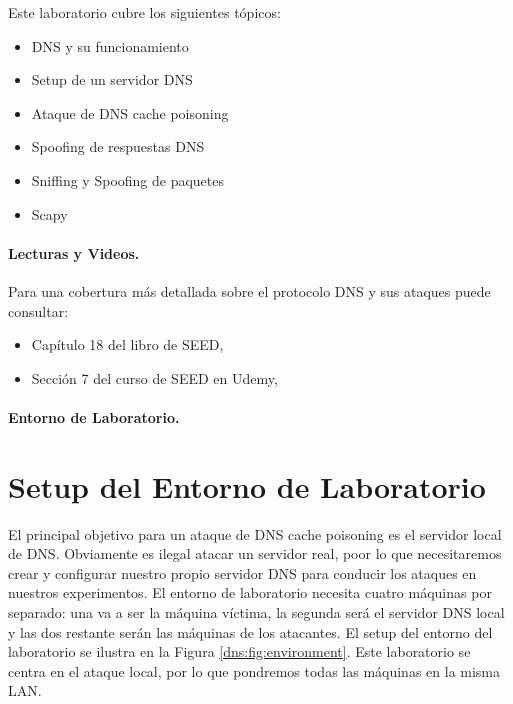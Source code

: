 Este laboratorio cubre los siguientes tópicos:


\begin{itemize}[noitemsep]
\item DNS y su funcionamiento
\item Setup de un servidor DNS
\item Ataque de DNS cache poisoning
\item Spoofing de respuestas DNS
\item Sniffing y Spoofing de paquetes
\item Scapy
\end{itemize}


\paragraph{Lecturas y Videos.}
Para una cobertura más detallada sobre el protocolo DNS y sus ataques puede consultar:

\begin{itemize}
\item Capítulo 18 del libro de SEED, \seedbook
\item Sección 7 del curso de SEED en Udemy, \seedisvideo
\end{itemize}


\paragraph{Entorno de Laboratorio.} \seedenvironmentC


\section{Setup del Entorno de Laboratorio}
\label{sec:environment}

El principal objetivo para un ataque de DNS cache poisoning es el servidor local de DNS. Obviamente es ilegal atacar un servidor real, poor lo que necesitaremos crear y configurar nuestro propio servidor DNS para conducir los ataques en nuestros experimentos. El entorno de laboratorio necesita cuatro máquinas por separado:
una va a ser la máquina víctima, la segunda será el servidor DNS local y las dos restante serán las máquinas de los atacantes.
El setup del entorno del laboratorio se ilustra en la Figura \ref{dns:fig:environment}.
Este laboratorio se centra en el ataque local, por lo que pondremos todas las máquinas en la misma LAN.


